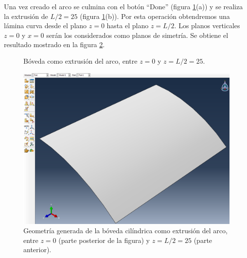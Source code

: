 \documentclass[spanish,a4paper,12pt]{article}
\begin{document}
Una vez creado el arco se culmina con el botón ``Done'' (figura \ref{fig:extru}(a)) y se realiza la extrusión de $L/2=25$ (figura \ref{fig:extru}(b)).
Por esta operación obtendremos una lámina curva desde el plano $z=0$ hasta el plano $z=L/2$.
Los planos verticales $z=0$ y $x=0$ serán los considerados como planos de simetría.
Se obtiene el resultado mostrado en la figura \ref{fig:extru1}.
\begin{figure}[h!tp]
\centering
{}
\caption{Bóveda como extrusión del arco, entre $z=0$ y $z=L/2=25$.}
\label{fig:extru}
\end{figure}
\begin{figure}[h!tp]
\centering
\includegraphics[scale=0.35]{capturas/07-part.png}
\caption{Geometría generada de la bóveda cilíndrica como extrusión del arco, entre $z=0$ (parte posterior de la figura) y $z=L/2=25$ (parte anterior).}
\label{fig:extru1}
\end{figure}
\clearpage
\end{document}
